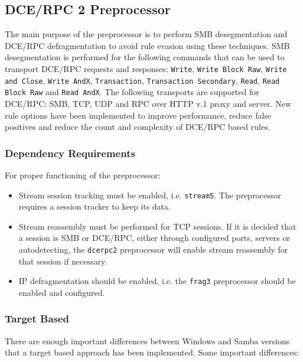 \documentclass[english]{report}
\begin{document}
\subsection{DCE/RPC 2 Preprocessor}
\label{sub:dcerpc2}

The main purpose of the preprocessor is to perform SMB desegmentation and
DCE/RPC defragmentation to avoid rule evasion using these techniques.  SMB
desegmentation is performed for the following commands that can be used to
transport DCE/RPC requests and responses: \texttt{Write}, \texttt{Write Block
Raw}, \texttt{Write and Close}, \texttt{Write AndX}, \texttt{Transaction},
\texttt{Transaction Secondary}, \texttt{Read}, \texttt{Read Block Raw} and
\texttt{Read AndX}.  The following transports are supported for DCE/RPC: SMB,
TCP, UDP and RPC over HTTP v.1 proxy and server.  New rule options have been
implemented to improve performance, reduce false positives and reduce the count
and complexity of DCE/RPC based rules.

\subsubsection{Dependency Requirements}

For proper functioning of the preprocessor:

\begin{itemize}

\item Stream session tracking must be enabled, i.e. \texttt{stream5}.  The
preprocessor requires a session tracker to keep its data.

\item Stream reassembly must be performed for TCP sessions. If it is decided
that a session is SMB or DCE/RPC, either through configured ports, servers or
autodetecting, the \texttt{dcerpc2} preprocessor will enable stream reassembly
for that session if necessary.

\item IP defragmentation should be enabled, i.e. the \texttt{frag3}
preprocessor should be enabled and configured.

\end{itemize}

\subsubsection{Target Based}

There are enough important differences between Windows and Samba versions that
a target based approach has been implemented. Some important differences:\\
\end{document}
